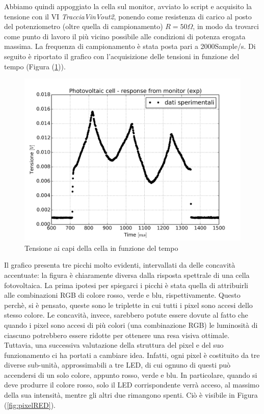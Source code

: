 \documentclass[journal, a4paper]{IEEEtran}
\begin{document}
Abbiamo quindi appoggiato la cella sul monitor, avviato lo script e acquisito la tensione con il VI \textit{TracciaVinVout2}, ponendo come resistenza di carico al posto del potenziometro (oltre quella di campionamento) $R = 50 \Omega$, in modo da trovarci come punto di lavoro il più vicino possibile alle condizioni di potenza erogata massima. La frequenza di campionamento è stata posta pari a 2000Sample/s. Di seguito è riportato il grafico con l'acquisizione delle tensioni in funzione del tempo (Figura (\ref{fig:1_dati_sperimentali})).\\

\begin{figure}
\centering
\includegraphics[width=0.8\linewidth]{./relaz_colori/1_dati_sperimentali}
\caption{Tensione ai capi della cella in funzione del tempo}
\label{fig:1_dati_sperimentali}
\end{figure}


Il grafico presenta tre picchi molto evidenti, intervallati da delle concavità accentuate: la figura è chiaramente diversa dalla risposta spettrale di una cella fotovoltaica. La prima ipotesi per spiegarci i picchi è stata quella di attribuirli alle combinazioni RGB di colore rosso, verde e blu, rispettivamente. Questo perchè, si è pensato, queste sono le triplette in cui tutti i pixel sono accesi dello stesso colore. Le concavità, invece, sarebbero potute essere dovute al fatto che quando i pixel sono accesi di più colori (una combinazione RGB) le luminosità di ciascuno potrebbero essere ridotte per ottenere una resa visiva ottimale.\\
Tuttavia, una successiva valutazione della struttura del pixel e del suo funzionamento ci ha portati a cambiare idea. Infatti, ogni pixel è costituito da tre diverse sub-unità, approssimabili a tre LED, di cui ognuno di questi può accendersi di un solo colore, appunto rosso, verde e blu. In particolare, quando si deve produrre il colore rosso, solo il LED corrispondente verrà acceso, al massimo della sua intensità, mentre gli altri due rimangono spenti. Ciò è visibile in Figura (\ref{fig:pixelRED}).
\end{document}
